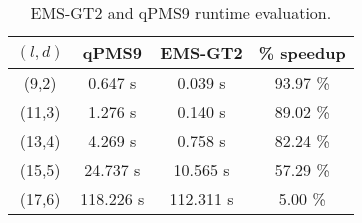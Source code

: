 \begin{table}[h] %
	\renewcommand{\arraystretch}{1.3}
	\centering
	\begin{tabular}{|c|c|c|c|}
	\hline 
	\bfseries\boldmath $(l,d)$ & 
	\bfseries qPMS9 & 
	\bfseries\boldmath EMS-GT2 & 
	\bfseries \% speedup\\
	\hline
	 (9,2) &   0.647 s &    0.039 s &   93.97 \%\\
	(11,3) &   1.276 s &    0.140 s &   89.02 \%\\
	(13,4) &   4.269 s &    0.758 s &   82.24 \%\\
	(15,5) &  24.737 s &   10.565 s &   57.29 \%\\
	(17,6) & 118.226 s &  112.311 s &   5.00 \%\\
	\hline\end{tabular}
	
	\caption{EMS-GT2 and qPMS9 runtime evaluation.}
	\label{tbl:final-results}
\end{table}


